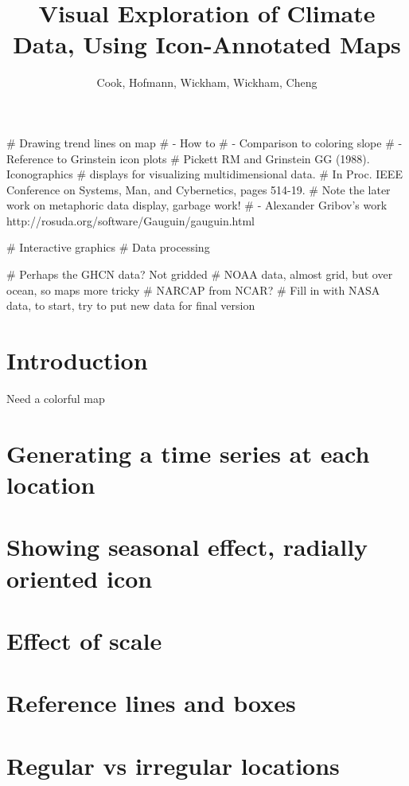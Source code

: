 \documentclass{article}
\begin{document}
\title{Visual Exploration of Climate Data, Using Icon-Annotated Maps}
\author{Cook, Hofmann, Wickham, Wickham, Cheng}

# Drawing trend lines on map
#   - How to
#   - Comparison to coloring slope
#   - Reference to Grinstein icon plots
# Pickett RM and Grinstein GG (1988). Iconographics 
# displays for visualizing multidimensional data. 
# In Proc. IEEE Conference on Systems, Man, and Cybernetics, pages 514-19.
# Note the later work on metaphoric data display, garbage work!
#   - Alexander Gribov's work http://rosuda.org/software/Gauguin/gauguin.html

# Interactive graphics
# Data processing

# Perhaps the GHCN data? Not gridded
# NOAA data, almost grid, but over ocean, so maps more tricky
# NARCAP from NCAR?
# Fill in with NASA data, to start, try to put new data for final version

\section{Introduction}

Need a colorful map

\section{Generating a time series at each location}

\section{Showing seasonal effect, radially oriented icon}

\section{Effect of scale}

\section{Reference lines and boxes}

\section{Regular vs irregular locations}
\end{document}
